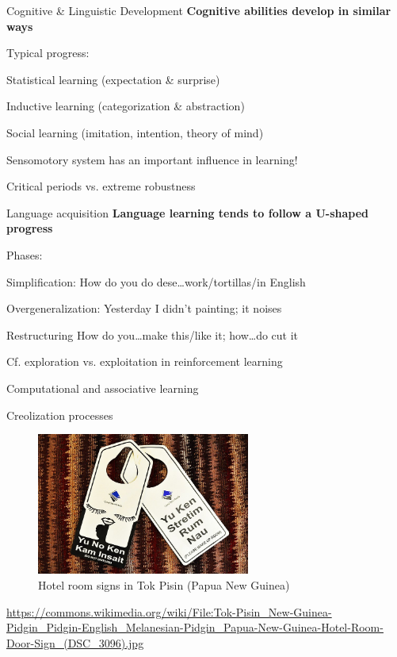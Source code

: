\documentclass[aspectratio=169,cramped]{beamer}
\let\tempone\itemize
\let\temptwo\enditemize
\renewenvironment{itemize}{\tempone\addtolength{\itemsep}{-0\baselineskip}\addtolength{\parskip}{-0.2\baselineskip}}{\temptwo}
\newcommand{\ex}[1]{{\color{teal} #1}}
\begin{document}
\begin{frame}{Cognitive \& Linguistic Development}
	\textbf{Cognitive abilities develop in similar ways}
	\begin{itemize}
  \item Typical progress:
    \begin{itemize}
    \item Statistical learning (expectation \& surprise)
    \item Inductive learning (categorization \& abstraction)
    \item Social learning (imitation, intention, theory of mind)
    \end{itemize}
  \item Sensomotory system has an important influence in learning!
  \item Critical periods vs. extreme robustness
  \end{itemize}
\end{frame}

\begin{frame}{Language acquisition}
	\textbf{Language learning tends to follow a U-shaped progress}
	\begin{itemize}
    \item Phases:
    \begin{itemize}
    \item Simplification: \ex{How do you do dese\ldots work/tortillas/in English}
    \item Overgeneralization: \ex{Yesterday I didn’t painting; it noises}
    \item Restructuring \ex{How do you\ldots make this/like it; how\ldots do cut it}
    \end{itemize}
  \item Cf. exploration vs. exploitation in reinforcement learning
  \item Computational and associative learning
  \end{itemize}
\end{frame}

\begin{frame}{Creolization processes}
  \vspace{-1cm}
  \begin{figure}
    \centering
    \includegraphics[width=7cm]{figures/hotel-sign.jpg}
    \caption{Hotel room signs in Tok Pisin (Papua New Guinea)}
  \end{figure}
  \vspace{-.1cm} \tiny \url{https://commons.wikimedia.org/wiki/File:Tok-Pisin_New-Guinea-Pidgin_Pidgin-English_Melanesian-Pidgin_Papua-New-Guinea-Hotel-Room-Door-Sign_(DSC_3096).jpg}
\end{frame}
\end{document}
